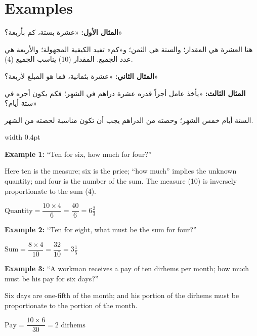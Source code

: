 \documentclass[11pt,a4paper]{book}
\begin{document}
\newpage

\section*{Examples}

\noindent\begin{minipage}[t]{0.48\textwidth}
\raggedleft

\begin{Arabic}
\textbf{المثال الأول:} «عشرة بستة، كم بأربعة؟»

هنا العشرة هي المقدار؛ والستة هي الثمن؛ و«كم» تفيد الكيفية المجهولة؛ والأربعة هي عدد الجميع. المقدار (10) يناسب الجميع (4).

\textbf{المثال الثاني:} «عشرة بثمانية، فما هو المبلغ لأربعة؟»

\textbf{المثال الثالث:} «يأخذ عامل أجراً قدره عشرة دراهم في الشهر؛ فكم يكون أجره في ستة أيام؟»

الستة أيام خمس الشهر؛ وحصته من الدراهم يجب أن تكون مناسبة لحصته من الشهر.
\end{Arabic}

\end{minipage}%
\hfill\vrule width 0.4pt\hfill
\begin{minipage}[t]{0.48\textwidth}
\raggedright

\textbf{Example 1:} ``Ten for six, how much for four?''

Here ten is the measure; six is the price; ``how much'' implies the unknown quantity; and four is the number of the sum. The measure (10) is inversely proportionate to the sum (4).

$\text{Quantity} = \dfrac{10 \times 4}{6} = \dfrac{40}{6} = 6\tfrac{2}{3}$

\vspace{0.3cm}

\textbf{Example 2:} ``Ten for eight, what must be the sum for four?''

$\text{Sum} = \dfrac{8 \times 4}{10} = \dfrac{32}{10} = 3\tfrac{1}{5}$

\vspace{0.3cm}

\textbf{Example 3:} ``A workman receives a pay of ten dirhems per month; how much must be his pay for six days?''

Six days are one-fifth of the month; and his portion of the dirhems must be proportionate to the portion of the month.

$\text{Pay} = \dfrac{10 \times 6}{30} = 2 \text{ dirhems}$

\end{minipage}
\vspace{0.3cm}
\end{document}
